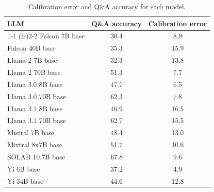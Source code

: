 \begin{table}[h]
\centering
\begin{tabular}{lcc}
\toprule
LLM & Q\&A accuracy & Calibration error \\ 
\cmidrule(lr){1-1} \cmidrule(lr){2-2} 
Falcon 7B base & 30.4 & 8.9\\
Falcon 40B base & 35.3 & 15.9\\
Llama 2 7B base & 32.3 & 13.8\\
Llama 2 70B base & 51.3 & 7.7\\
Llama 3.0 8B base & 47.7 & 6.5\\
Llama 3.0 70B base & 62.3 & 7.8\\
Llama 3.1 8B base & 46.9 & 16.5\\
Llama 3.1 70B base & 62.7 & 15.5\\
Mistral 7B base & 48.4 & 13.0\\
Mixtral 8x7B base & 51.7 & 10.6\\
SOLAR 10.7B base & 67.8 & 9.6\\
Yi 6B base & 37.2 & 4.9\\
Yi 34B base & 44.6 & 12.8\\
\bottomrule
\end{tabular}
\caption{Calibration error and Q\&A accuracy for each model.}
\label{tab:calibration__platt_prob_max__k20}
\end{table}
